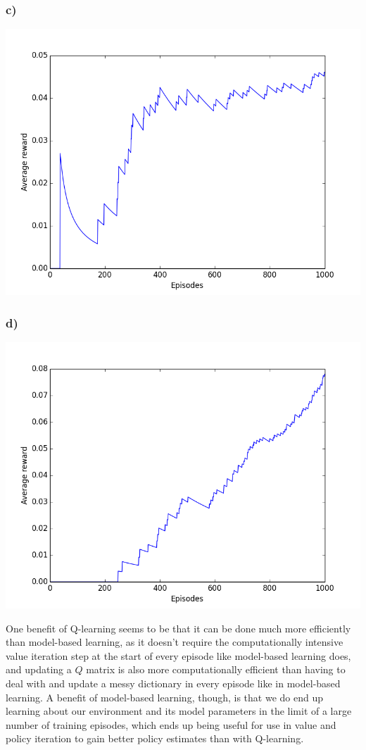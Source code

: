 \documentclass[11pt]{scrartcl}
\begin{document}
\subsubsection*{c)}
\begin{center}
\includegraphics[width=\textwidth]{PS1Q5c.png}
\end{center}

\subsubsection*{d)}
\begin{center}
\includegraphics[width=\textwidth]{PS1Q5d.png}
\end{center}

One benefit of Q-learning seems to be that it can be done much more efficiently than model-based learning, as it doesn't require the computationally intensive value iteration step at the start of every episode like model-based learning does, and updating a $Q$ matrix is also more computationally efficient than having to deal with and update a messy dictionary in every episode like in model-based learning. A benefit of model-based learning, though, is that we do end up learning about our environment and its model parameters in the limit of a large number of training episodes, which ends up being useful for use in value and policy iteration to gain better policy estimates than with Q-learning.
\end{document}
